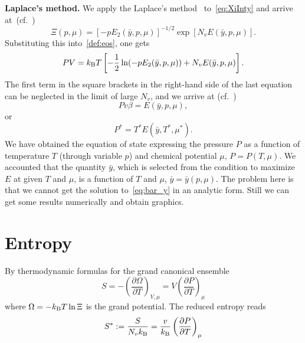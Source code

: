 \documentclass[12pt]{article}
\numberwithin{equation}{section}
\begin{document}
	\textbf{Laplace's method.} We apply the Laplace's method~\cite[(1.21)]{Fedoryuk89} to~\eqref{eq:XiInty} and arrive at~(cf.~\cite[(19)]{KD22})
	\begin{equation}
		\Xi(p,\mu) = [-p E_2(\bar{y},p,\mu)]^{-1/2} \exp[N_v E(\bar{y},p,\mu)].
	\end{equation}
	Substituting this into~\eqref{def:eos}, one gets
	\begin{equation}
		P V = k_{\rm B}T \left[-\frac{1}{2} \ln(-p E_2(\bar{y},p,\mu)) + N_v E(\bar{y},p,\mu)\right].
	\end{equation}
	The first term in the square brackets in the right-hand side of the last equation can be neglected in the limit of large $N_v$, and we arrive at (cf.~\cite[(2.27)]{KKD20})
	\begin{equation}
		P v \beta = E(\bar{y},p,\mu),
	\end{equation}
	or
	\begin{equation}
		P^* = T^* E(\bar{y},T^*,\mu^*).
	\end{equation}
	We have obtained the equation of state expressing the pressure $P$ as a function of temperature $T$ (through variable $p$) and chemical potential $\mu$, $P = P(T, \mu)$. We accounted that the quantity $\bar{y}$, which is selected from the condition to maximize $E$ at given $T$ and $\mu$, is a function of $T$ and $\mu$, $\bar{y} = \bar{y}(p,\mu)$. The problem here is that we cannot get the solution to~\eqref{eq:bar_y} in an analytic form. Still we can get some results numerically and obtain graphics.
	
	
	\section{Entropy}
	By thermodynamic formulas for the grand canonical ensemble
	\begin{equation}
		S = -\left(\frac{\partial \Omega}{\partial T}\right)_{V,\mu} = V\left(\frac{\partial P}{\partial T}\right)_{\mu}
	\end{equation}
	where $\Omega = -k_{\rm B}T \ln \Xi$ is the grand potential. The reduced entropy reads
	\begin{equation}
		S^* := \frac{S}{N_v k_{\rm B}} = \frac{v}{k_{\rm B}} \left(\frac{\partial P}{\partial T}\right)_{\mu}
	\end{equation}
	
	
	
	\appendix
	
\end{document}
